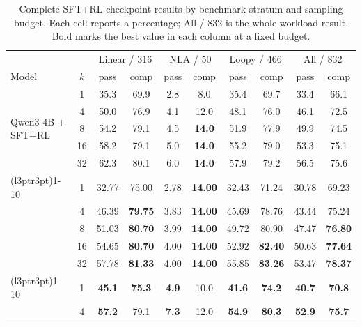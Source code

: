 \begin{table}[H]
\centering
\small
\renewcommand{\arraystretch}{0.86}
\caption{Complete SFT+RL-checkpoint results by benchmark stratum and sampling
budget.  Each cell reports a percentage; All / 832 is the whole-workload
result.  Bold marks the best value in each column at a fixed budget.}
\label{tab:rl-complete}
\setlength{\tabcolsep}{2.4pt}
\begin{tabular}{lccccccccc}
\toprule
\rowcolor{algobg}
& & \multicolumn{2}{c}{Linear / 316} & \multicolumn{2}{c}{NLA / 50}
  & \multicolumn{2}{c}{Loopy / 466} & \multicolumn{2}{c}{All / 832} \\
\headercmidrules{\cmidrule(lr){3-4}\cmidrule(lr){5-6}\cmidrule(lr){7-8}\cmidrule(lr){9-10}}
\rowcolor{algobg}
Model & \(k\) & pass & comp & pass & comp & pass & comp & pass & comp \\
\midrule
\multirow{5}{*}{Qwen3-4B + SFT+RL}
 & 1  & 35.3 & 69.9 & 2.8 & 8.0 & 35.4 & 69.7 & 33.4 & 66.1 \\
 & 4  & 50.0 & 76.9 & 4.1 & 12.0 & 48.1 & 76.0 & 46.1 & 72.5 \\
 & 8  & 54.2 & 79.1 & 4.5 & \textbf{14.0} & 51.9 & 77.9 & 49.9 & 74.5 \\
 & 16 & 58.2 & 79.1 & 5.0 & \textbf{14.0} & 55.2 & 79.0 & 53.3 & 75.1 \\
 & 32 & 62.3 & 80.1 & 6.0 & \textbf{14.0} & 57.9 & 79.2 & 56.5 & 75.6 \\
\cmidrule(l{3pt}r{3pt}){1-10}
\multirow{5}{*}{Qwen3-8B + SFT+RL}
 & 1  & 32.77 & 75.00 & 2.78 & \textbf{14.00} & 32.43 & 71.24 & 30.78 & 69.23 \\
 & 4  & 46.39 & \textbf{79.75} & 3.83 & \textbf{14.00} & 45.69 & 78.76 & 43.44 & 75.24 \\
 & 8  & 51.03 & \textbf{80.70} & 3.99 & \textbf{14.00} & 49.72 & 80.90 & 47.47 & \textbf{76.80} \\
 & 16 & 54.65 & \textbf{80.70} & 4.00 & \textbf{14.00} & 52.92 & \textbf{82.40} & 50.63 & \textbf{77.64} \\
 & 32 & 57.78 & \textbf{81.33} & 4.00 & \textbf{14.00} & 55.85 & \textbf{83.26} & 53.47 & \textbf{78.37} \\
\cmidrule(l{3pt}r{3pt}){1-10}
\multirow{5}{*}{Qwen3-14B + SFT+RL}
 & 1  & \textbf{45.1} & \textbf{75.3} & \textbf{4.9} & 10.0 & \textbf{41.6} & \textbf{74.2} & \textbf{40.7} & \textbf{70.8} \\
 & 4  & \textbf{57.2} & 79.1 & \textbf{7.3} & 12.0 & \textbf{54.9} & \textbf{80.3} & \textbf{52.9} & \textbf{75.7} \\

\end{tabular}
\end{table}
